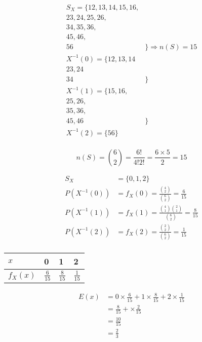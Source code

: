 \documentclass[12pt]{book}
\begin{document}
\begin{align*}
S_{X} = \{ 12, 13, 14, 15, 16,& \\
 23, 24, 25, 26,& \\
 34, 35, 36,& \\ 
 45 , 46,& \\ 
 56& \} \Rightarrow n(S) = 15 \\
X^{-1}(0) = \{ 12, 13, 14& \\
 23, 24& \\
 34& \}  \\
X^{-1}(1) = \{ 15, 16,& \\
 25, 26,& \\
 35, 36,& \\
 45 , 46& \}  \\
X^{-1}(2) = \{ 56 \}  \\
\end{align*}


$$
n(S) = \binom{6}{2} = \frac{6!}{4!2!} = \frac{6 \times 5}{2} = 15
$$




\begin{align*}
S_{X} &= \{ 0, 1, 2 \} \\
P(X^{-1}(0)) &= f_{X}(0) = \frac{\binom{4}{2}}{\binom{6}{2}}  = \frac{6}{15} \\
P(X^{-1}(1)) &= f_{X}(1) = \frac{\binom{4}{1}\binom{2}{1}}{\binom{6}{2}} = \frac{8}{15} \\
P(X^{-1}(2)) &= f_{X}(2) = \frac{\binom{2}{2}}{\binom{6}{2}} = \frac{1}{15} \\
\end{align*}




\begin{center}
\begin{latin}
\begin{tabular}{ l |  l  l  l }
  $x$ & 0 & 1 & 2  \\
  \hline
  $f_{X}(x)$ & $\frac{6}{15}$ & $\frac{8}{15}$ & $\frac{1}{15}$   \\
\end{tabular}
\end{latin}
\end{center}





\begin{align*}
E(x) &= 0 \times \frac{6}{15} 
+ 1 \times \frac{8}{15} 
+ 2 \times \frac{1}{15}  \\
&= \frac{8}{15} + \times \frac{2}{15} \\
&= \frac{10}{15} \\
&= \frac{2}{3} \\
\end{align*}
\end{document}
